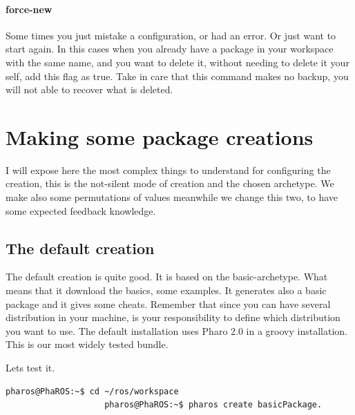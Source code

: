 \documentclass[a4paper,10pt,twoside]{book}
\begin{document}
				\paragraph{force-new}
					Some times you just mistake a configuration, or had an error. Or just want to start again. In this cases when you already have a package in your workspace with the same name, and you want to delete it, without needing to delete it your self, add this flag as true. Take in care that this command makes no backup, you will not able to recover what is deleted.
				
				
				
				
				
				\section{Making some package creations}
				
				I will expose here the most complex things to understand for configuring the creation, this is the not-silent mode of creation and the chosen archetype. We make also some permutations of values meanwhile we change this two, to have some expected feedback knowledge.
				
				
				
				\subsection{The default creation}
				
				The default creation is quite good. It is based on the basic-archetype. What means that it download the \fwkName{} basics, some examples. It generates also a basic package and it gives some cheats. Remember that since you can have several distribution in your machine, is your responsibility to define which distribution you want to use. The default installation uses Pharo 2.0 in a groovy installation. This is our most widely tested bundle.
				
				
				
				
				
				Lets test it. 
				\begin{lstlisting}[language=bash,title={ Default package creation }]
					pharos@PhaROS:~$ cd ~/ros/workspace
					pharos@PhaROS:~$ pharos create basicPackage.
				\end{lstlisting} 
				
				
				
\end{document}
